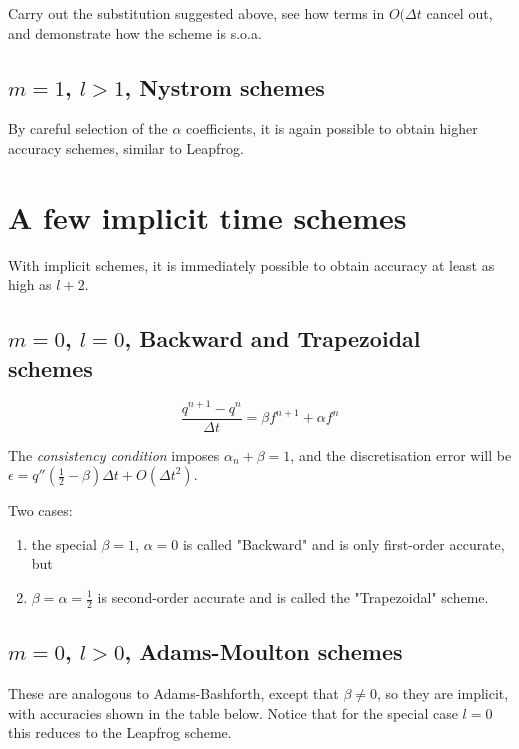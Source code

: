 \begin{exercise}
Carry out the substitution suggested above, see how terms in $O({\Delta t}$ cancel out, and demonstrate how the scheme is s.o.a.
\end{exercise}

\subsection{$m=1$, $l>1$, Nystrom schemes}
By careful selection of the $\alpha$ coefficients, it is again possible to obtain higher accuracy schemes, similar to Leapfrog.

\section{A few implicit time schemes}
With implicit schemes, it is immediately possible to obtain accuracy at least as high as $l+2$.

\subsection{$m=0$, $l=0$, Backward and Trapezoidal schemes}

\begin{equation}
	\frac{q^{n+1}-q^{n}}{\Delta t} = \beta f^{n+1} + \alpha f^n
	\label{Implicit}
\end{equation}

The \emph{consistency condition} imposes $\alpha_n + \beta =1$, and the discretisation error will be $\epsilon = q'' \left( \frac{1}{2} -\beta \right) \Delta t + O({\Delta t}^2)$.

Two cases: 
\begin{enumerate}
\item the special $\beta = 1$, $\alpha=0$ is called "Backward" and is only first-order accurate, but 
\item $\beta = \alpha=\frac{1}{2}$ is second-order accurate and is called the "Trapezoidal" scheme.
\end{enumerate}

\subsection{$m=0$, $l>0$, Adams-Moulton schemes}
These are analogous to Adams-Bashforth, except that $\beta \ne 0$, so they are implicit, with accuracies shown in the table below. Notice that for the special case $l=0$ this reduces to the Leapfrog scheme.

